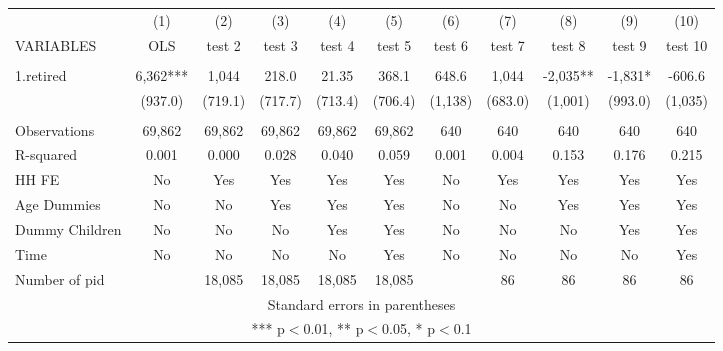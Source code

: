 \begin{tabular}{lcccccccccc} \hline
 & (1) & (2) & (3) & (4) & (5) & (6) & (7) & (8) & (9) & (10) \\
VARIABLES & OLS & test 2 & test 3 & test 4 & test 5 & test 6 & test 7 & test 8 & test 9 & test 10 \\ \hline
 &  &  &  &  &  &  &  &  &  &  \\
1.retired & 6,362*** & 1,044 & 218.0 & 21.35 & 368.1 & 648.6 & 1,044 & -2,035** & -1,831* & -606.6 \\
 & (937.0) & (719.1) & (717.7) & (713.4) & (706.4) & (1,138) & (683.0) & (1,001) & (993.0) & (1,035) \\
 &  &  &  &  &  &  &  &  &  &  \\
Observations & 69,862 & 69,862 & 69,862 & 69,862 & 69,862 & 640 & 640 & 640 & 640 & 640 \\
R-squared & 0.001 & 0.000 & 0.028 & 0.040 & 0.059 & 0.001 & 0.004 & 0.153 & 0.176 & 0.215 \\
HH FE & No & Yes & Yes & Yes & Yes & No & Yes & Yes & Yes & Yes \\
Age Dummies & No & No & Yes & Yes & Yes & No & No & Yes & Yes & Yes \\
Dummy Children & No & No & No & Yes & Yes & No & No & No & Yes & Yes \\
Time & No & No & No & No & Yes & No & No & No & No & Yes \\
 Number of pid &  & 18,085 & 18,085 & 18,085 & 18,085 &  & 86 & 86 & 86 & 86 \\ \hline
\multicolumn{11}{c}{ Standard errors in parentheses} \\
\multicolumn{11}{c}{ *** p$<$0.01, ** p$<$0.05, * p$<$0.1} \\
\end{tabular}
